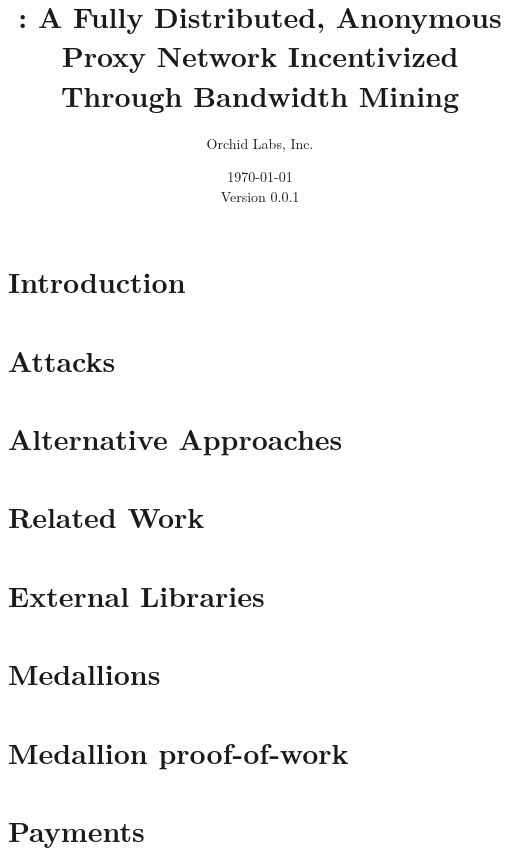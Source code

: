 \documentclass{article}
\title{\Orchid: A Fully Distributed, Anonymous Proxy Network Incentivized Through Bandwidth Mining}
\author{Orchid Labs, Inc.}
\date{\today{} \\ Version 0.0.1}
\begin{document}
\maketitle

\begin{abstract}

\end{abstract}

\newpage
\tableofcontents
\newpage

\section{Introduction}
\label{sec:overview}


\section{Attacks}
\label{sec:attacks}


\section{Alternative Approaches}
\label{sec:prior-work}


\section{Related Work}
\label{sec:related}


\section{External Libraries}
\label{sec:external-libraries}


\section{Medallions}
\label{medallions}


\section{Medallion proof-of-work}
\label{medallionspow}


\section{Payments}
\label{sec:payments}

\end{document}
